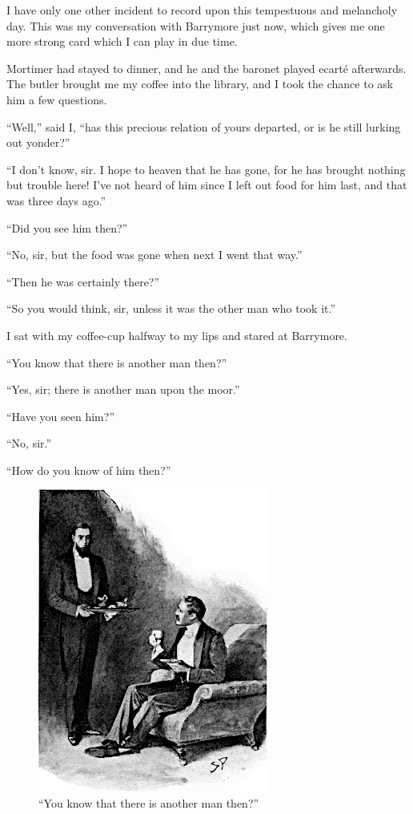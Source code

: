 \documentclass[paper=5.5in:8.5in,BCOR=7mm,twoside,DIV=calc,12pt,usegeometry,openany,chapterprefix,endperiod,headings=big]{scrbook} %
\begin{document}
I have only one other incident to record upon this tempestuous and melancholy day. This was my conversation with Barrymore just now, which gives me one more strong card which I can play in due time.

Mortimer had stayed to dinner, and he and the baronet played ecarté afterwards. The butler brought me my coffee into the library, and I took the chance to ask him a few questions.

\enquote{Well,} said I, \enquote{has this precious relation of yours departed, or is he still lurking out yonder?}

\enquote{I don't know, sir. I hope to heaven that he has gone, for he has brought nothing but trouble here! I've not heard of him since I left out food for him last, and that was three days ago.}

\enquote{Did you see him then?}

\enquote{No, sir, but the food was gone when next I went that way.}

\enquote{Then he was certainly there?}

\enquote{So you would think, sir, unless it was the other man who took it.}

I sat with my coffee-cup halfway to my lips and stared at Barrymore.

\enquote{You know that there is another man then?}

\enquote{Yes, sir; there is another man upon the moor.}

\enquote{Have you seen him?}

\enquote{No, sir.}

\enquote{How do you know of him then?}

\begin{figure}[tbh]
\centering
\includegraphics[width=.7\linewidth]{09_anotherman}
\caption{\enquote{You know that there is another man then?}}
\end{figure}
\end{document}
